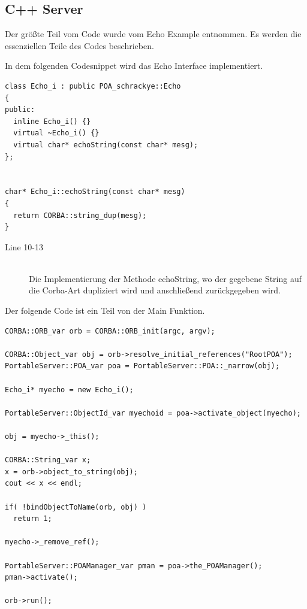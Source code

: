 \documentclass[11pt]{article}
\begin{document}
\subsection{C++ Server}

Der größte Teil vom Code wurde vom Echo Example entnommen. Es werden die essenziellen Teile des Codes beschrieben. 

In dem folgenden Codesnippet wird das Echo Interface implementiert.

\begin{lstlisting}
class Echo_i : public POA_schrackye::Echo
{
public:
  inline Echo_i() {}
  virtual ~Echo_i() {}
  virtual char* echoString(const char* mesg);
};


char* Echo_i::echoString(const char* mesg)
{
  return CORBA::string_dup(mesg);
}
\end{lstlisting}

\begin{description}

\item[Line 10-13] \hfill \\
Die Implementierung der Methode echoString, wo der gegebene String auf die Corba-Art dupliziert wird und anschließend zurückgegeben wird.

\end{description}

Der folgende Code ist ein Teil von der Main Funktion.

\begin{lstlisting}
CORBA::ORB_var orb = CORBA::ORB_init(argc, argv);

CORBA::Object_var obj = orb->resolve_initial_references("RootPOA");
PortableServer::POA_var poa = PortableServer::POA::_narrow(obj);

Echo_i* myecho = new Echo_i();

PortableServer::ObjectId_var myechoid = poa->activate_object(myecho);

obj = myecho->_this();

CORBA::String_var x;
x = orb->object_to_string(obj);
cout << x << endl;

if( !bindObjectToName(orb, obj) )
  return 1;

myecho->_remove_ref();

PortableServer::POAManager_var pman = poa->the_POAManager();
pman->activate();

orb->run();
\end{lstlisting}
\end{document}
